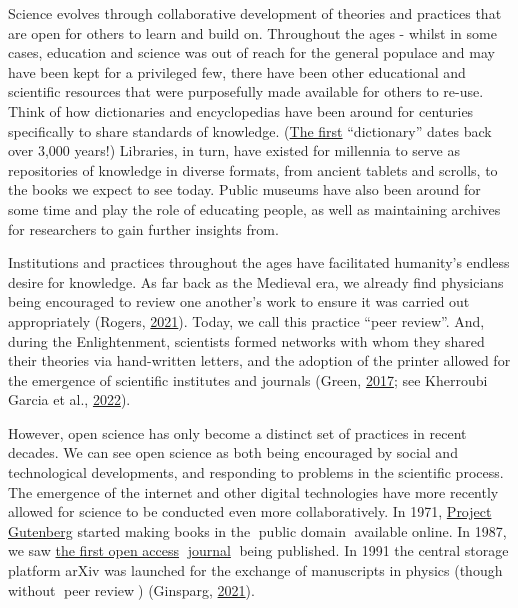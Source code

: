 \documentclass[
  letterpaper,
  DIV=11,
  numbers=noendperiod]{scrreport}
\begin{document}

Science evolves through collaborative development of theories and
practices that are open for others to learn and build on. Throughout the
ages - whilst in some cases, education and science was out of reach for
the general populace and may have been kept for a privileged few, there
have been other educational and scientific resources that were
purposefully made available for others to re-use. Think of how
dictionaries and encyclopedias have been around for centuries
specifically to share standards of knowledge.
(\href{https://oi.uchicago.edu/research/publications/assyrian-dictionary-oriental-institute-university-chicago-cad}{The
first} ``dictionary'' dates back over 3,000 years!) Libraries, in turn,
have existed for millennia to serve as repositories of knowledge in
diverse formats, from ancient tablets and scrolls, to the books we
expect to see today. Public museums have also been around for some time
and play the role of educating people, as well as maintaining archives
for researchers to gain further insights from.

Institutions and practices throughout the ages have facilitated
humanity's endless desire for knowledge. As far back as the Medieval
era, we already find physicians being encouraged to review one another's
work to ensure it was carried out appropriately (Rogers,
\href{https://doi.org/10.1308/rcsann.2020.0214}{2021}). Today, we call
this practice ``peer review''. And, during the Enlightenment, scientists
formed networks with whom they shared their theories via hand-written
letters, and the adoption of the printer allowed for the emergence of
scientific institutes and journals (Green,
\href{https://www.wiley.com/network/societyleaders/open-science/an-illustrated-history-of-open-science}{2017};
see Kherroubi Garcia et al.,
\href{doi.org/10.5281/zenodo.5731452}{2022}).

However, open science has only become a distinct set of practices in
recent decades. We can see open science as both being encouraged by
social and technological developments, and responding to problems in the
scientific process. The emergence of the internet and other digital
technologies have more recently allowed for science to be conducted even
more collaboratively. In 1971,
\href{https://www.gutenberg.org/about/background/history_and_philosophy.html}{Project
Gutenberg} started making books in the 📖public domain📖 available
online. In 1987, we saw
\href{https://uh-ir.tdl.org/handle/10657/5149}{the first open access}
📖\href{https://uh-ir.tdl.org/handle/10657/5149}{journal}📖 being
published. In 1991 the central storage platform arXiv was launched for
the exchange of manuscripts in physics (though without 📖peer review📖)
(Ginsparg, \href{https://doi.org/10.1038/s42254-021-00360-z}{2021}).
\end{document}
